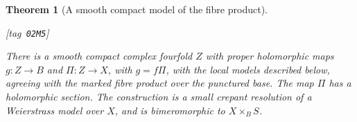 \documentclass[11pt,a4paper]{article}
\numberwithin{equation}{section}
\newtheorem{theorem}{Theorem}[section]
\theoremstyle{definition}
\newcommand{\StatementRecord}[4]{{\upshape\footnotesize[tag~\texttt{#3}]}\enspace\ignorespaces}
\begin{document}
\begin{theorem}[A smooth compact model of the fibre product]\hypertarget{tag-02M5}{}\label{maps:src:E.1.2}
\StatementRecord{maps:src:E.1.2}{proved}{02M5}{\cref{def:V:resolved-product-data}, \cref{night:P1.9}, \eqref{maps:eq:E.1}, \eqref{maps:eq:E.4}, \eqref{maps:eq:E.3}}


There is a smooth compact complex fourfold $Z$ with proper holomorphic
maps $g:Z\to B$ and $\Pi:Z\to X$, with $g=f\Pi$, with the local models described below, agreeing with the marked fibre product over the punctured base.  The map $\Pi$
has a holomorphic section.  The construction is a small crepant
resolution of a Weierstrass model over $X$, and is bimeromorphic to
$X\times_B S$.

\end{theorem}
\end{document}
